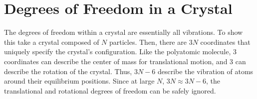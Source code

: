 
\section{Degrees of Freedom in a Crystal}%
\label{sec:crystal_dof}
The degrees of freedom within a crystal are essentially all vibrations. To show
this take a crystal composed of $N$ particles. Then, there are $3N$ coordinates
that uniquely specify the crystal's configuration. Like the polyatomic molecule,
3 coordinates can describe the center of mass for translational motion, and 3
can describe the rotation of the crystal. Thus, $3N - 6$ describe the vibration
of atoms around their equilibrium positions. Since at large $N$, $3N \approx 3N
- 6$, the translational and rotational degrees of freedom can be safely ignored.

